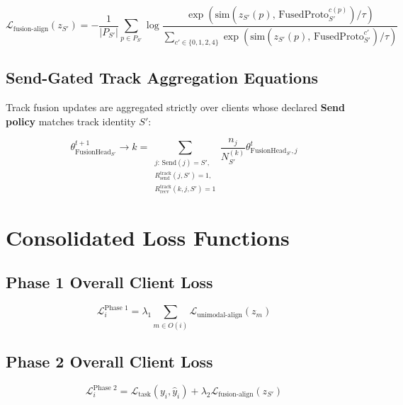\documentclass[11pt,a4paper]{article}
\begin{document}
\begin{equation}
\mathcal{L}_{\text{fusion-align}}(z_{S'}) = -\frac{1}{|P_{S'}|} \sum_{p \in P_{S'}} \log \frac{\exp\left(\text{sim}(z_{S'}(p),\, \text{FusedProto}_{S'}^{c(p)}) / \tau\right)}{\sum_{c' \in \{0,1,2,4\}} \exp\left(\text{sim}(z_{S'}(p),\, \text{FusedProto}_{S'}^{c'}) / \tau\right)}
\end{equation}

\subsection{Send-Gated Track Aggregation Equations}

Track fusion updates are aggregated strictly over clients whose declared \textbf{Send policy} matches track identity $S'$:

\begin{equation}
\theta_{\text{FusionHead}_{S'}}^{t+1} \to k = \sum_{\substack{j:\, \text{Send}(j)=S',\\ R_{\text{send}}^{\text{track}}(j,S')=1,\\ R_{\text{recv}}^{\text{track}}(k,j,S')=1}} \frac{n_j}{N_{S'}^{(k)}} \theta_{\text{FusionHead}_{S'}, j}^t
\end{equation}

\newpage

\section{Consolidated Loss Functions}

\subsection{Phase 1 Overall Client Loss}
\begin{equation}
\mathcal{L}_i^{\text{Phase 1}} = \lambda_1 \sum_{m \in O(i)} \mathcal{L}_{\text{unimodal-align}}(z_m)
\end{equation}

\subsection{Phase 2 Overall Client Loss}
\begin{equation}
\mathcal{L}_i^{\text{Phase 2}} = \mathcal{L}_{\text{task}}(y_i, \hat{y}_i) + \lambda_2 \mathcal{L}_{\text{fusion-align}}(z_{S'})
\end{equation}
\end{document}
